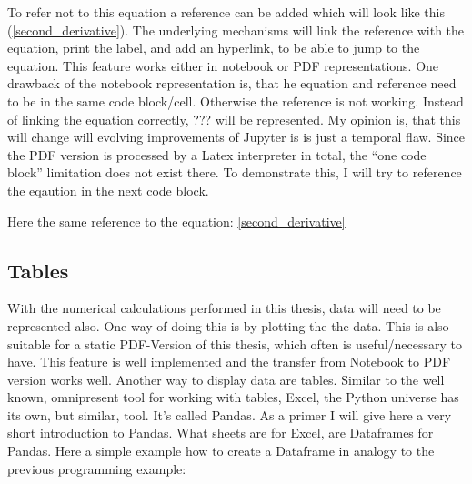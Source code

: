 \documentclass[11pt]{article}
\begin{document}
To refer not to this equation a reference can be added which will look
like this (\ref{second_derivative}). The underlying mechanisms will link
the reference with the equation, print the label, and add an hyperlink,
to be able to jump to the equation. This feature works either in
notebook or PDF representations. One drawback of the notebook
representation is, that he equation and reference need to be in the same
code block/cell. Otherwise the reference is not working. Instead of
linking the equation correctly, ??? will be represented. My opinion is,
that this will change will evolving improvements of Jupyter is is just a
temporal flaw. Since the PDF version is processed by a Latex interpreter
in total, the ``one code block'' limitation does not exist there. To
demonstrate this, I will try to reference the eqaution in the next code
block.

    Here the same reference to the equation: \ref{second_derivative}

    \hypertarget{tables}{%
\subsection{Tables}\label{tables}}

With the numerical calculations performed in this thesis, data will need
to be represented also. One way of doing this is by plotting the the
data. This is also suitable for a static PDF-Version of this thesis,
which often is useful/necessary to have. This feature is well
implemented and the transfer from Notebook to PDF version works well.
Another way to display data are tables. Similar to the well known,
omnipresent tool for working with tables, Excel, the Python universe has
its own, but similar, tool. It's called Pandas. As a primer I will give
here a very short introduction to Pandas. What sheets are for Excel, are
Dataframes for Pandas. Here a simple example how to create a Dataframe
in analogy to the previous programming example:
\end{document}
